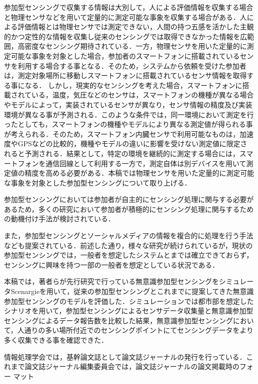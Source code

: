 \documentclass[submit,techrep]{ipsj}
\begin{document}
参加型センシングで収集する情報は大別して，人による評価情報を収集する場合\cite{Lam}と物理センサなどを用いて定量的に測定可能な事象を収集する場合\cite{Shinohara}がある．人による評価情報とは物理センサでは測定できない，人間の持つ五感を活かした主観的かつ定性的な情報を収集し従来のセンシングでは取得できなかった情報を広範囲，高密度なセンシング期待されている．一方，物理センサを用いた定量的に測定可能な事象を対象とした場合，参加者のスマートフォンに搭載されているセンサを利用する場合する事となる．そのため，システムから依頼を受けた参加者は，測定対象場所に移動しスマートフォンに搭載されているセンサ情報を取得する事になる．
しかし，現実的なセンシングを考えた場合，スマートフォンに搭載されている，温度，気圧などのセンサは，スマートフォンの機種が異なる場合やモデルによって，実装されているセンサが異なり，センサ情報の精度及び実装環境が異なる事が予測される．このような条件では，同一環境において測定を行ったとしても，スマートフォンの機種やモデルにより異なる測定値が得られる事が考えられる．そのため，スマートフォン内臓センサで利用可能なものは，加速度やGPSなどの比較的，機種やモデルの違いに影響を受けない測定値に限定されると予測される．結果として，特定の環境を継続的に測定する場合には，スマートフォンを通信回線として利用する一方で，測定自体は別デバイスを用いて測定値の精度を高める必要がある\cite{Li}．本稿では物理センサを用いた定量的に測定可能な事象を対象とした参加型センシングについて取り上げる．


参加型センシングにおいては参加者が自主的にセンシング処理に関与する必要があるため，多くの研究において参加者が積極的にセンシング処理に関与するための動機付け手法が検討されている\cite{Yoshitaka}．


また，参加型センシングとソーシャルメディアの情報を複合的に処理を行う手法なども提案されている\cite{Demirbas}．前述した通り，様々な研究が続けられているが，現状の参加型センシングでは，一般者を想定したシステムとまでは確立できておらず，センシングに興味を持つ一部の一般者を想定としている状況である．

本稿では，著者らが先行研究\cite{Mizukami}で行っている無意識参加型センシングをシミュレータScenargie\cite{Scenargie}を用いて，従来の参加型センシングとこれまでに提案してきた無意識参加型センシングのモデルを評価した．シミュレーションでは都市部を想定したシナリオを用いて，参加型センシングによるセンサデータ収集量と無意識参加型センシングによるデータ報告数を比較した結果，無意識参加型センシングにおいて，人通りの多い場所付近でのセンシングポイントにてセンシングデータをより多く収集できる事を確認できた．



情報処理学会では，基幹論文誌として論文誌ジャーナルの発行を行っている．こ
れまで論文誌ジャーナル編集委員会では，論文誌ジャーナルの論文掲載時のフォー
マット
\end{document}
